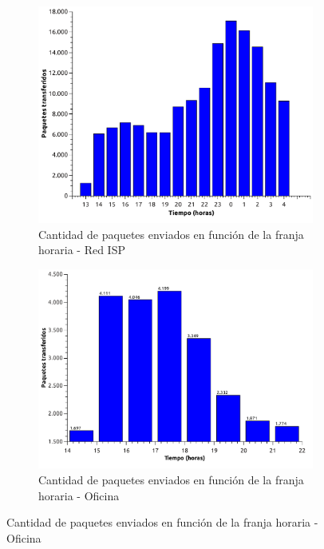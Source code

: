 \begin{figure}[H]
        \begin{subfigure}[H]{0.5\textwidth}
                \centering
                \includegraphics[width=1\textwidth]{graficos/paquetesVsTiempoCasa.pdf}
                \caption{Cantidad de paquetes enviados en funci\'on de la franja horaria - Red ISP}
                \label{fig:paquetes1}
        \end{subfigure}
        \begin{subfigure}[H]{0.5\textwidth}
                \centering
                \includegraphics[width=1\textwidth]{graficos/paquetesVsTiempoOficina.pdf}
                \caption{Cantidad de paquetes enviados en funci\'on de la franja horaria - Oficina}
                \label{fig:paquetes2}
        \end{subfigure}
\end{figure}

